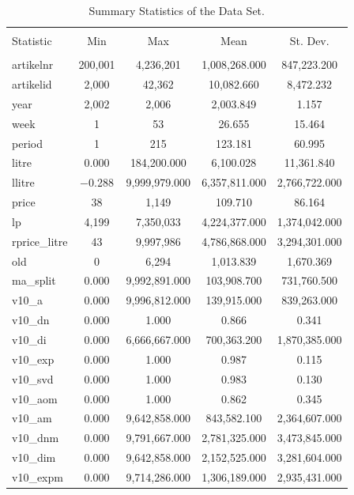 \documentclass[11pt,]{article}
\begin{document}
\begin{table}[!htbp] \centering 
  \caption{Summary Statistics of the Data Set.} 
  \label{tab:SumStat} 
\begin{tabular}{@{\extracolsep{5pt}}lcccc} 
\\[-1.8ex]\hline 
\hline \\[-1.8ex] 
Statistic & \multicolumn{1}{c}{Min} & \multicolumn{1}{c}{Max} & \multicolumn{1}{c}{Mean} & \multicolumn{1}{c}{St. Dev.} \\ 
\hline \\[-1.8ex] 
artikelnr & 200,001 & 4,236,201 & 1,008,268.000 & 847,223.200 \\ 
artikelid & 2,000 & 42,362 & 10,082.660 & 8,472.232 \\ 
year & 2,002 & 2,006 & 2,003.849 & 1.157 \\ 
week & 1 & 53 & 26.655 & 15.464 \\ 
period & 1 & 215 & 123.181 & 60.995 \\ 
litre & 0.000 & 184,200.000 & 6,100.028 & 11,361.840 \\ 
llitre & $-$0.288 & 9,999,979.000 & 6,357,811.000 & 2,766,722.000 \\ 
price & 38 & 1,149 & 109.710 & 86.164 \\ 
lp & 4,199 & 7,350,033 & 4,224,377.000 & 1,374,042.000 \\ 
rprice\_litre & 43 & 9,997,986 & 4,786,868.000 & 3,294,301.000 \\ 
old & 0 & 6,294 & 1,013.839 & 1,670.369 \\ 
ma\_split & 0.000 & 9,992,891.000 & 103,908.700 & 731,760.500 \\ 
v10\_a & 0.000 & 9,996,812.000 & 139,915.000 & 839,263.000 \\ 
v10\_dn & 0.000 & 1.000 & 0.866 & 0.341 \\ 
v10\_di & 0.000 & 6,666,667.000 & 700,363.200 & 1,870,385.000 \\ 
v10\_exp & 0.000 & 1.000 & 0.987 & 0.115 \\ 
v10\_svd & 0.000 & 1.000 & 0.983 & 0.130 \\ 
v10\_aom & 0.000 & 1.000 & 0.862 & 0.345 \\ 
v10\_am & 0.000 & 9,642,858.000 & 843,582.100 & 2,364,607.000 \\ 
v10\_dnm & 0.000 & 9,791,667.000 & 2,781,325.000 & 3,473,845.000 \\ 
v10\_dim & 0.000 & 9,642,858.000 & 2,152,525.000 & 3,281,604.000 \\ 
v10\_expm & 0.000 & 9,714,286.000 & 1,306,189.000 & 2,935,431.000 \\ 

\end{tabular}
\end{table}
\end{document}
